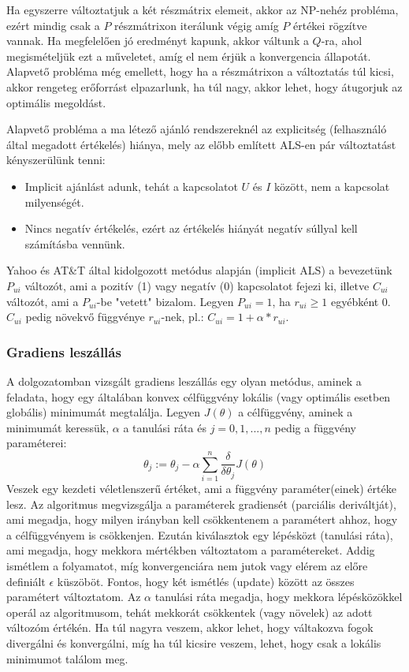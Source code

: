 \documentclass[a4paper,12pt]{article}
\begin{document}
Ha egyszerre változtatjuk a két részmátrix elemeit, akkor az NP-nehéz probléma, ezért mindig csak a $P$ részmátrixon iterálunk végig amíg $P$ értékei rögzítve vannak. Ha megfelelően jó eredményt kapunk, akkor váltunk a $Q$-ra, ahol megismételjük ezt a műveletet, amíg el nem érjük a konvergencia állapotát. Alapvető probléma még emellett, hogy ha a részmátrixon a változtatás túl kicsi, akkor rengeteg erőforrást elpazarlunk, ha túl nagy, akkor lehet, hogy átugorjuk az optimális megoldást. \newline

Alapvető probléma a ma létező ajánló rendszereknél az explicitség (felhasználó által megadott értékelés) hiánya, mely az előbb említett ALS-en pár változtatást kényszerülünk tenni\cite{koren}:
\begin{itemize}
\item Implicit ajánlást adunk, tehát a kapcsolatot $U$ és $I$ között, nem a kapcsolat milyenségét.
\item Nincs negatív értékelés, ezért az értékelés hiányát negatív súllyal kell számításba vennünk.
\end{itemize}

Yahoo és AT\&T \cite{koren} által kidolgozott metódus alapján (implicit ALS) a bevezetünk $P_{ui}$ változót, ami a pozitív (1) vagy negatív (0) kapcsolatot fejezi ki, illetve $C_{ui}$ változót, ami a $P_{ui}$-be "vetett" bizalom. Legyen $P_{ui} = 1$, ha $r_{ui}\geq1$ egyébként 0. $C_{ui}$ pedig növekvő függvénye $r_{ui}$-nek, pl.: $C_{ui}=1+\alpha*r_{ui}$.

\subsubsection{Gradiens leszállás}

A dolgozatomban vizsgált gradiens leszállás egy olyan metódus, aminek a feladata, hogy egy általában konvex célfüggvény lokális (vagy optimális esetben globális) minimumát megtalálja. Legyen $J(\theta)$ a célfüggvény, aminek a minimumát keressük, $\alpha$ a tanulási ráta és $j=0, 1, ..., n$ pedig a függvény paraméterei:
\[\theta_j:=\theta_j-\alpha\sum\limits_{i=1}^n\frac{\delta}{\delta\theta_j}J(\theta)\]\cite{andrewml}
Veszek egy kezdeti véletlenszerű értéket, ami a függvény paraméter(einek) értéke lesz. Az algoritmus megvizsgálja a paraméterek gradiensét (parciális deriváltját), ami megadja, hogy milyen irányban kell csökkentenem a paramétert ahhoz, hogy a célfüggvényem is csökkenjen. Ezután kiválasztok egy lépésközt (tanulási ráta), ami megadja, hogy mekkora mértékben változtatom a paramétereket. Addig ismétlem a folyamatot, míg konvergenciára nem jutok vagy elérem az előre definiált $\epsilon$ küszöböt. Fontos, hogy két ismétlés (update) között az összes paramétert változtatom. \newline
Az $\alpha$ tanulási ráta megadja, hogy mekkora lépésközökkel operál az algoritmusom, tehát mekkorát csökkentek (vagy növelek) az adott változóm értékén. Ha túl nagyra veszem, akkor lehet, hogy váltakozva fogok divergálni és konvergálni, míg ha túl kicsire veszem, lehet, hogy csak a lokális minimumot találom meg.
\end{document}

